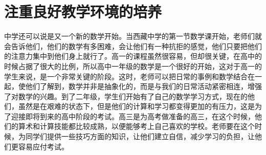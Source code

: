 \section{注重良好教学环境的培养}

中学还可以说是又一个新的数学开始。当西藏中学的第一节数学课开始，老师们就会告诉他们，他们的数学有多困难，会让他们有一种抗拒的感觉，他们只要把他们的注意力集中到他们身上就行了。高一的课程虽然很容易，但却很关键，在高中的时候占据了很大的比例，所以高中一年级的数学是一个很好的开始，这对于高一的学生来说，是一个非常关键的阶段。这时，老师可以把日常的事例和数学结合在一起，使他们了解到，数学并非是抽象化的，而是与我们的日常活动紧密相连，增强了对数学的兴趣。到了二年级，学生们开始有了自己的数学学习方式，现在的他们，虽然是在艰难的状态下，但是他们的计算和学习都变得更加的有压力，这是为了迎接即将到来的高中阶段的考试。高三是为高考做准备的高三，在这个时候，他们的算术和计算技能都比较成熟，以便能够考上自己喜欢的学校。老师要在这个时候，为同学们提供一些技巧方面的知识，让他们建立自信，减少学习的负担，让他们更容易应付考试。